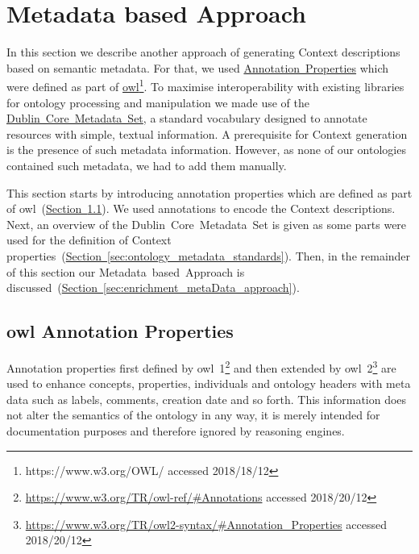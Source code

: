 
\section{Metadata based Approach}\label{sec:embedded_context}
In this section we describe another approach of generating Context descriptions based on semantic metadata.
For that, we used \hyperref[sec:OWL_annotation_properties]{Annotation~Properties} which were defined as part of \hyperref[sec:OWL_annotation_properties]{\gls{owl}\footnote{\url{https://www.w3.org/OWL/} accessed 2018/18/12}}. To maximise interoperability with existing libraries for ontology processing and manipulation we made use of the \hyperref[sec:dublin_core_metadata_vocabulary]{Dublin~Core~Metadata~Set}, a standard vocabulary designed to annotate resources with simple, textual information. A prerequisite for Context generation is the presence of such metadata information.
However, as none of our ontologies contained such metadata, we had to add them manually. 

This section starts by introducing annotation properties which are defined as part of \gls{owl}~(\hyperref[sec:OWL_annotation_properties]{Section~\ref*{sec:OWL_annotation_properties}}).
We used annotations to encode the Context descriptions. Next, an overview of the Dublin~Core~Metadata~Set is given as some parts were used for the definition of Context properties~(\hyperref[sec:ontology_metadata_standards]{Section~\ref*{sec:ontology_metadata_standards}}).
Then, in the remainder of this section our Metadata~based~Approach is discussed~(\hyperref[sec:enrichment_metaData_approach]{Section~\ref*{sec:enrichment_metaData_approach}}).

\subsection{\gls{owl} Annotation Properties}\label{sec:OWL_annotation_properties}
Annotation properties first defined by \gls{owl}~1\footnote{\url{https://www.w3.org/TR/owl-ref/\#Annotations} accessed 2018/20/12} and then extended by \gls{owl}~2\footnote{\url{https://www.w3.org/TR/owl2-syntax/\#Annotation_Properties} accessed 2018/20/12} are used to enhance concepts, properties, individuals and ontology headers with meta data such as labels, comments, creation date and so forth. This information does not alter the semantics of the ontology in any way, it is merely intended for documentation purposes and therefore ignored by reasoning engines. 

